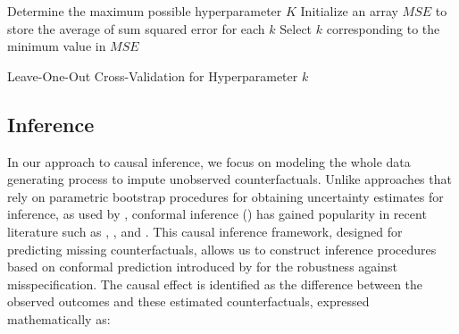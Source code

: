 \documentclass[12pt]{article}
\begin{document}
\begin{algorithm}[!ht]
    \SetAlgoLined
    Determine the maximum possible hyperparameter $K$\;
    Initialize an array $MSE$ to store the average of sum squared error for each $k$\;
      Select $k$ corresponding to the minimum value in $MSE$\;
    \caption{Leave-One-Out Cross-Validation for Hyperparameter $k$}
    \label{algorithm: 2}
\end{algorithm}

\subsection{Inference}

In our approach to causal inference, we focus on modeling the whole data generating process to impute unobserved counterfactuals. Unlike approaches that rely on parametric bootstrap procedures for obtaining uncertainty estimates for inference, as used by \cite{xu2017generalized}, conformal inference (\cite{chernozhukov2021exact}) has gained popularity in recent literature such as \cite{ben2021augmented}, \cite{roth2023s}, and \cite{imbens2024causal}. This causal inference framework, designed for predicting missing counterfactuals, allows us to construct inference procedures based on conformal prediction introduced by \cite{shafer2008tutorial} for the robustness against misspecification. The causal effect is identified as the difference between the observed outcomes and these estimated counterfactuals, expressed mathematically as:
\end{document}
